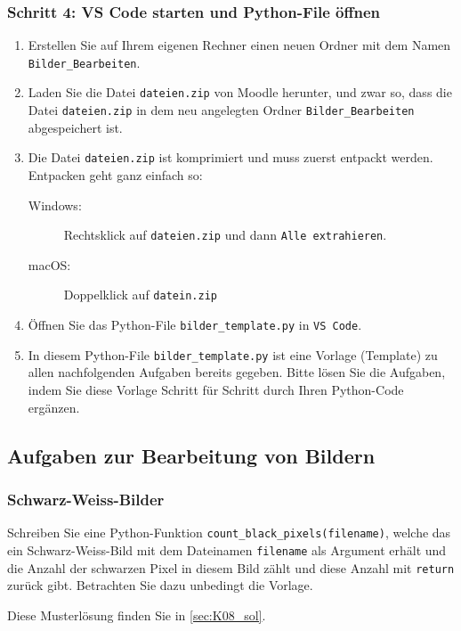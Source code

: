 \subsubsection*{Schritt 4: VS Code starten und Python-File öffnen}
\begin{enumerate}
	\item Erstellen Sie auf Ihrem eigenen Rechner einen neuen Ordner  mit dem Namen \texttt{Bilder\_Bearbeiten}.
	\item Laden Sie die Datei \texttt{dateien.zip} von Moodle herunter, und zwar so, dass die Datei \texttt{dateien.zip} in dem neu angelegten Ordner \texttt{Bilder\_Bearbeiten} abgespeichert ist.
	\item Die Datei \texttt{dateien.zip} ist komprimiert und muss zuerst entpackt werden. Entpacken geht ganz einfach so:
	      \begin{description}
		      \item[Windows:] Rechtsklick auf \texttt{dateien.zip} und dann \texttt{Alle extrahieren}.
		      \item[macOS:] Doppelklick auf \texttt{datein.zip}
	      \end{description}
	\item Öffnen Sie das Python-File \texttt{bilder\_template.py} in \texttt{VS Code}.
	\item In diesem Python-File \texttt{bilder\_template.py} ist eine Vorlage (Template) zu allen nachfolgenden Aufgaben bereits gegeben. Bitte lösen Sie die Aufgaben, indem Sie diese Vorlage Schritt für Schritt durch Ihren Python-Code ergänzen.
\end{enumerate}

\subsection{Aufgaben zur Bearbeitung von Bildern}
\subsubsection{Schwarz-Weiss-Bilder}
\begin{myexercise}
	Schreiben Sie eine Python-Funktion \lstinline|count_black_pixels(filename)|, welche das ein Schwarz-Weiss-Bild mit dem Dateinamen \lstinline|filename| als Argument erhält und die Anzahl der schwarzen Pixel in diesem Bild zählt und diese Anzahl mit \lstinline|return| zurück gibt. Betrachten Sie dazu unbedingt die Vorlage.
	\begin{myanswer}
		Diese Musterlösung finden Sie in \cref{sec:K08_sol}.
	\end{myanswer}
\end{myexercise}

